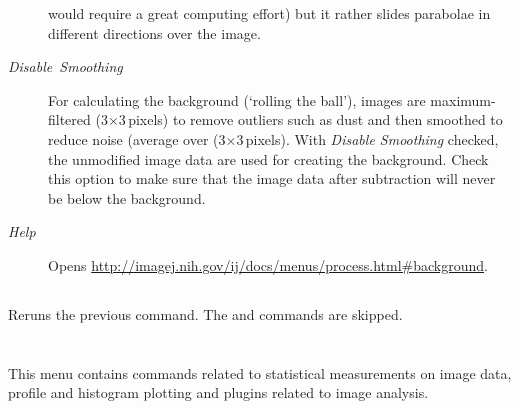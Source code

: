 \begin{description}
would require a great computing effort) but it rather slides parabolae
in different directions over the image.
\item [{\emph{Disable\ Smoothing}}] For calculating the background (`rolling
the ball'), images are maximum-filtered (3$\times$3\,pixels) to
remove outliers such as dust and then smoothed to reduce noise (average
over (3$\times$3\,pixels). With \emph{Disable Smoothing} checked,
the unmodified image data are used for creating the background. Check
this option to make sure that the image data after subtraction will
never be below the background.
\item [{\emph{Help}}] Opens \href{http://imagej.nih.gov/ij/docs/menus/process.html\#background}{http://imagej.nih.gov/ij/docs/menus/process.html\#{}background}.
\end{description}



\subsection{\protect{}\label{sub:Repeat-Command-[R]}}

Reruns the previous command. The 
and  commands are skipped.



\clearpage{}


\section{\protect{}\label{sec:Analyze-Menu}}

This menu contains commands related to statistical measurements on
image data, profile and histogram plotting and plugins related to
image analysis.


